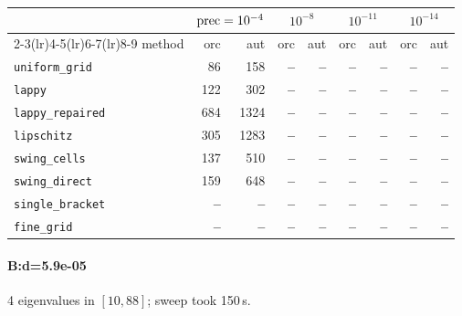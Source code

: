 \begin{center}
\small
\begin{tabular}{lrrrrrrrr}
\toprule
& \multicolumn{2}{c}{$\mathrm{prec}=10^{-4}$} & \multicolumn{2}{c}{$10^{-8}$} & \multicolumn{2}{c}{$10^{-11}$} & \multicolumn{2}{c}{$10^{-14}$} \\
\cmidrule(lr){2-3}\cmidrule(lr){4-5}\cmidrule(lr){6-7}\cmidrule(lr){8-9}
method & orc & aut & orc & aut & orc & aut & orc & aut \\
\midrule
\texttt{uniform\_grid} & 86 & 158 & \textbf{--} & \textbf{--} & \textbf{--} & \textbf{--} & \textbf{--} & \textbf{--} \\
\texttt{lappy} & 122 & 302 & \textbf{--} & \textbf{--} & \textbf{--} & \textbf{--} & \textbf{--} & \textbf{--} \\
\texttt{lappy\_repaired} & 684 & 1324 & \textbf{--} & \textbf{--} & \textbf{--} & \textbf{--} & \textbf{--} & \textbf{--} \\
\texttt{lipschitz} & 305 & 1283 & \textbf{--} & \textbf{--} & \textbf{--} & \textbf{--} & \textbf{--} & \textbf{--} \\
\texttt{swing\_cells} & 137 & 510 & \textbf{--} & \textbf{--} & \textbf{--} & \textbf{--} & \textbf{--} & \textbf{--} \\
\texttt{swing\_direct} & 159 & 648 & \textbf{--} & \textbf{--} & \textbf{--} & \textbf{--} & \textbf{--} & \textbf{--} \\
\midrule
\texttt{single\_bracket} & \textbf{--} & \textbf{--} & \textbf{--} & \textbf{--} & \textbf{--} & \textbf{--} & \textbf{--} & \textbf{--} \\
\texttt{fine\_grid} & \textbf{--} & \textbf{--} & \textbf{--} & \textbf{--} & \textbf{--} & \textbf{--} & \textbf{--} & \textbf{--} \\
\bottomrule
\end{tabular}
\end{center}

\paragraph{B:d=5.9e-05} 4 eigenvalues in $[10, 88]$; sweep took 150\,s.

